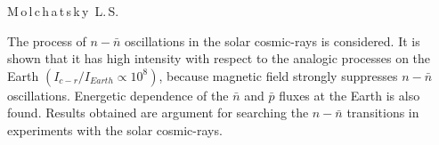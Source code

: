 



 {M\,o\,l\,c\,h\,a\,t\,s\,k\,y~L.\,S.}









\engabstract

{The process of $n {-} \bar n$ oscillations in the solar cosmic-rays is considered. It is shown that it has high intensity with respect to the analogic processes on the Earth $(I_{c{-}r}/I_{Earth} \propto 10^8)$, because magnetic field strongly suppresses $n {-} \bar n$ oscillations. Energetic dependence of the $\bar n$ and $\bar p$ fluxes at the Earth is also found. Results obtained are argument for searching the $n {-} \bar n$ transitions in experiments with the solar cosmic-rays.}






\date{20/XII/2010}






\maketitle





